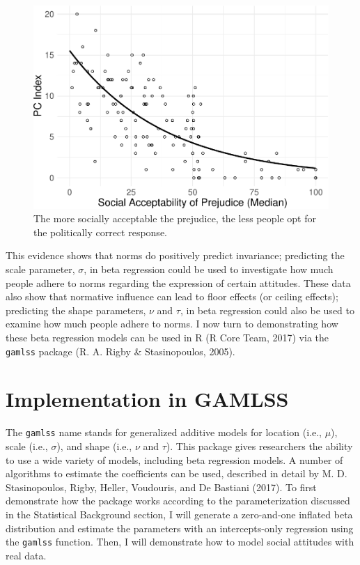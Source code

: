 \documentclass[english,man]{apa6}
\theoremstyle{definition}
\theoremstyle{definition}
\theoremstyle{remark}
\begin{document}
\begin{figure}
\centering
\includegraphics{beta_hurdle_files/figure-latex/unnamed-chunk-4-1.pdf}
\caption{\label{fig:unnamed-chunk-4}The more socially acceptable the
prejudice, the less people opt for the politically correct response.}
\end{figure}

This evidence shows that norms do positively predict invariance;
predicting the scale parameter, \(\sigma\), in beta regression could be
used to investigate how much people adhere to norms regarding the
expression of certain attitudes. These data also show that normative
influence can lead to floor effects (or ceiling effects); predicting the
shape parameters, \(\nu\) and \(\tau\), in beta regression could also be
used to examine how much people adhere to norms. I now turn to
demonstrating how these beta regression models can be used in R (R Core
Team, 2017) via the \texttt{gamlss} package (R. A. Rigby \&
Stasinopoulos, 2005).

\section{Implementation in GAMLSS}\label{implementation-in-gamlss}

The \texttt{gamlss} name stands for generalized additive models for
location (i.e., \(\mu\)), scale (i.e., \(\sigma\)), and shape (i.e.,
\(\nu\) and \(\tau\)). This package gives researchers the ability to use
a wide variety of models, including beta regression models. A number of
algorithms to estimate the coefficients can be used, described in detail
by M. D. Stasinopoulos, Rigby, Heller, Voudouris, and De Bastiani
(2017). To first demonstrate how the package works according to the
parameterization discussed in the Statistical Background section, I will
generate a zero-and-one inflated beta distribution and estimate the
parameters with an intercepts-only regression using the \texttt{gamlss}
function. Then, I will demonstrate how to model social attitudes with
real data.
\end{document}
